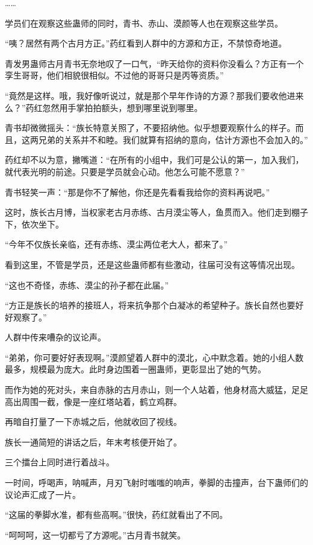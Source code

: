 \begin{this_body}
……

学员们在观察这些蛊师的同时，青书、赤山、漠颜等人也在观察这些学员。

“咦？居然有两个古月方正。”药红看到人群中的方源和方正，不禁惊奇地道。

青发男蛊师古月青书无奈地叹了一口气，“昨天给你的资料你没看么？方正有一个孪生哥哥，他们相貌很相似。不过他的哥哥只是丙等资质。”

“竟然是这样。哦，我好像听说过，就是那个早年作诗的方源？那我们要收他进来么？”药红忽然用手掌拍拍额头，想到哪里说到哪里。

青书却微微摇头：“族长特意关照了，不要招纳他。似乎想要观察什么的样子。而且，这两兄弟的关系并不和睦。我们就算有招纳的意向，估计方源也不会加入的。”

药红却不以为意，撇嘴道：“在所有的小组中，我们可是公认的第一，加入我们，就代表光明的前途。只要是学员就会心动。他怎么可能不愿意？”

青书轻笑一声：“那是你不了解他，你还是先看看我给你的资料再说吧。”

这时，族长古月博，当权家老古月赤练、古月漠尘等人，鱼贯而入。他们走到棚子下，依次坐下。

“今年不仅族长亲临，还有赤练、漠尘两位老大人，都来了。”

看到这里，不管是学员，还是这些蛊师都有些激动，往届可没有这等情况出现。

“这也不奇怪，赤练、漠尘的孙子都在此届。”

“方正是族长的培养的接班人，将来抗争那个白凝冰的希望种子。族长自然也要好好观察了。”

人群中传来嘈杂的议论声。

“弟弟，你可要好好表现啊。”漠颜望着人群中的漠北，心中默念着。她的小组人数最多，规模最为庞大。此时身边围着一圈蛊师，更彰显出了她的气势。

而作为她的死对头，来自赤脉的古月赤山，则一个人站着，他身材高大威猛，足足高出周围一截，像是一座红塔站着，鹤立鸡群。

再暗自打量了一下赤城之后，他就收回了视线。

族长一通简短的讲话之后，年末考核便开始了。

三个擂台上同时进行着战斗。

一时间，呼喝声，呐喊声，月刃飞射时嗤嗤的响声，拳脚的击撞声，台下蛊师们的议论声汇成了一片。

“这届的拳脚水准，都有些高啊。”很快，药红就看出了不同。

“呵呵呵，这一切都亏了方源呢。”古月青书就笑。


\end{this_body}
